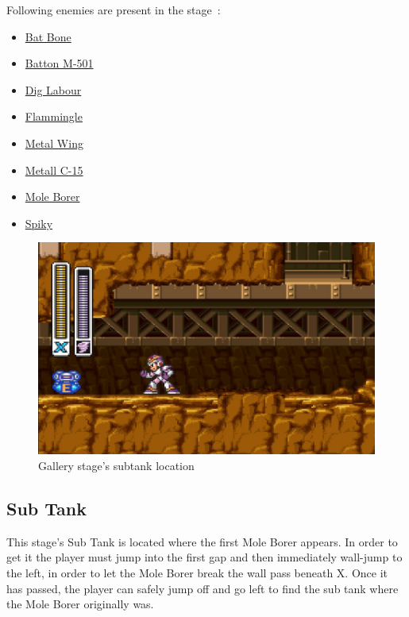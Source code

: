 Following enemies are present in the stage~\cite{wiki:Gallery}:
\begin{itemize}
	\item \hyperlink{enem:Batton_Bone}{Bat Bone} 
	\item \hyperlink{enem:Batton_M-501}{Batton M-501} 
	\item \hyperlink{enem:Dig_Labour}{Dig Labour} 
	\item \hyperlink{enem:Flammingle}{Flammingle} 
	\item \hyperlink{enem:Metal_Wing}{Metal Wing} 
	\item \hyperlink{enem:Metall_C-15}{Metall C-15} 
	\item \hyperlink{miniboss:Mole_Borer}{Mole Borer}
	\item \hyperlink{enem:Spiky}{Spiky}
\end{itemize}


\begin{figure}[htp]
	\centering
	\includegraphics[width=0.5\linewidth]{figures/X1/Armored_armadillo/Armadillo_tank.jpg}
	\caption{Gallery stage's subtank location}
\end{figure}

\subsection{Sub Tank}
This stage's Sub Tank is located where the first Mole Borer appears. In order to get it the player must jump into the first gap and then immediately wall-jump to the left, in order to let the Mole Borer break the wall pass beneath X. Once it has passed, the player can safely jump off and go left to find the sub tank where the Mole Borer originally was. 

